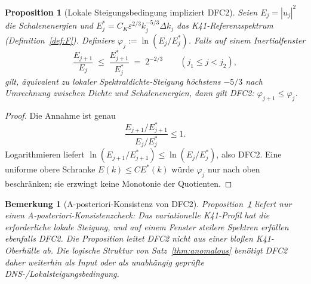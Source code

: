 \documentclass[12pt,a4paper]{article}
\theoremstyle{breakdef}
\theoremstyle{breakplain}
\newtheorem{proposition}[definition]{Proposition}
\theoremstyle{breakdef}
\newtheorem{remark}[definition]{Bemerkung}
\begin{document}
\begin{proposition}[Lokale Steigungsbedingung impliziert DFC2]\label{prop:dfc2-from-k41}
Seien $E_j = |u_j|^2$ die Schalenenergien und
$E_j^* = C_K \varepsilon^{2/3} k_j^{-5/3}\Delta k_j$ das
K41-Referenzspektrum (Definition~\ref{def:F}). Definiere
$\varphi_j := \ln(E_j / E_j^*)$. Falls auf einem Inertialfenster
\[
  \frac{E_{j+1}}{E_j}
  \;\le\;
  \frac{E_{j+1}^*}{E_j^*}
  \;=\;2^{-2/3}
  \qquad (j_1 \le j < j_2),
\]
gilt, äquivalent zu lokaler Spektraldichte-Steigung höchstens $-5/3$ nach
Umrechnung zwischen Dichte und Schalenenergien, dann gilt DFC2:
$\varphi_{j+1}\le\varphi_j$.
\end{proposition}

\begin{proof}
Die Annahme ist genau
\[
  \frac{E_{j+1}/E_{j+1}^*}{E_j/E_j^*}\le 1.
\]
Logarithmieren liefert
$\ln(E_{j+1}/E_{j+1}^*)\le \ln(E_j/E_j^*)$, also DFC2. Eine uniforme
obere Schranke $E(k)\le C E^*(k)$ würde $\varphi_j$ nur nach oben
beschränken; sie erzwingt keine Monotonie der Quotienten.
\end{proof}

\begin{remark}[A-posteriori-Konsistenz von DFC2]\label{rem:empirical-reduction}
Proposition~\ref{prop:dfc2-from-k41} liefert nur einen
\emph{A-posteriori-Konsistenzcheck}: Das variationelle K41-Profil hat die
erforderliche lokale Steigung, und auf einem Fenster steilere Spektren
erfüllen ebenfalls DFC2. Die Proposition leitet DFC2 nicht aus einer bloßen
K41-Oberhülle ab. Die logische Struktur von Satz~\ref{thm:anomalous}
benötigt DFC2 daher weiterhin als Input oder als unabhängig geprüfte
DNS-/Lokalsteigungsbedingung.
\end{remark}
\end{document}
